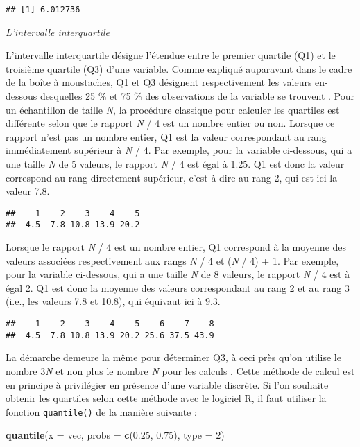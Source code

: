 \documentclass[
  french,
]{book}
\newenvironment{Shaded}{\begin{snugshade}}{\end{snugshade}}
\newcommand{\DataTypeTok}[1]{\textcolor[rgb]{0.13,0.29,0.53}{#1}}
\newcommand{\DecValTok}[1]{\textcolor[rgb]{0.00,0.00,0.81}{#1}}
\newcommand{\FloatTok}[1]{\textcolor[rgb]{0.00,0.00,0.81}{#1}}
\newcommand{\KeywordTok}[1]{\textcolor[rgb]{0.13,0.29,0.53}{\textbf{#1}}}
\newcommand{\NormalTok}[1]{#1}
\begin{document}
\begin{verbatim}
## [1] 6.012736
\end{verbatim}

\emph{L'intervalle interquartile}

L'intervalle interquartile désigne l'étendue entre le premier quartile (Q1) et le troisième quartile (Q3) d'une variable. Comme expliqué auparavant dans le cadre de la boîte à moustaches, Q1 et Q3 désignent respectivement les valeurs en-dessous desquelles 25 \% et 75 \% des observations de la variable se trouvent \autocite{chatellierMoyenneMedianeLeurs2003}. Pour un échantillon de taille \emph{N}, la procédure classique pour calculer les quartiles est différente selon que le rapport \emph{N} / 4 est un nombre entier ou non. Lorsque ce rapport n'est pas un nombre entier, Q1 est la valeur correspondant au rang immédiatement supérieur à \emph{N} / 4. Par exemple, pour la variable ci-dessous, qui a une taille \emph{N} de 5 valeurs, le rapport \emph{N} / 4 est égal à 1.25. Q1 est donc la valeur correspond au rang directement supérieur, c'est-à-dire au rang 2, qui est ici la valeur 7.8.

\begin{verbatim}
##    1    2    3    4    5 
##  4.5  7.8 10.8 13.9 20.2
\end{verbatim}

Lorsque le rapport \emph{N} / 4 est un nombre entier, Q1 correspond à la moyenne des valeurs associées respectivement aux rangs \emph{N} / 4 et (\emph{N} / 4) + 1. Par exemple, pour la variable ci-dessous, qui a une taille \emph{N} de 8 valeurs, le rapport \emph{N} / 4 est à égal 2. Q1 est donc la moyenne des valeurs correspondant au rang 2 et au rang 3 (i.e., les valeurs 7.8 et 10.8), qui équivaut ici à 9.3.

\begin{verbatim}
##    1    2    3    4    5    6    7    8 
##  4.5  7.8 10.8 13.9 20.2 25.6 37.5 43.9
\end{verbatim}

La démarche demeure la même pour déterminer Q3, à ceci près qu'on utilise le nombre 3\emph{N} et non plus le nombre \emph{N} pour les calculs \autocite{labreucheDifferentsTypesVariables2010}. Cette méthode de calcul est en principe à privilégier en présence d'une variable discrète. Si l'on souhaite obtenir les quartiles selon cette méthode avec le logiciel R, il faut utiliser la fonction \texttt{quantile()} de la manière suivante :

\begin{Shaded}
\begin{Highlighting}[]
\KeywordTok{quantile}\NormalTok{(}\DataTypeTok{x =}\NormalTok{ vec, }\DataTypeTok{probs =} \KeywordTok{c}\NormalTok{(}\FloatTok{0.25}\NormalTok{, }\FloatTok{0.75}\NormalTok{), }\DataTypeTok{type =} \DecValTok{2}\NormalTok{)}
\end{Highlighting}
\end{Shaded}
\end{document}
